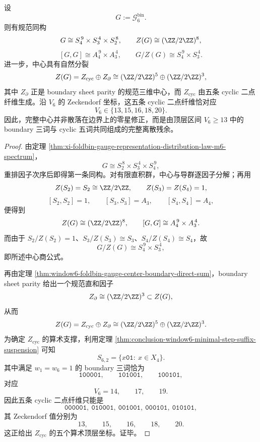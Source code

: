 \begin{theorem}\label{thm:conclusion-window6-full-center-derived-central-quotient}
设
\[
G:=\mathcal G_6^{\mathrm{bin}}.
\]
则有规范同构
\[
G\cong S_4^{\,9}\times S_3^{\,4}\times S_2^{\,8},
\qquad
Z(G)\cong (\ZZ/2\ZZ)^8,
\]
\[
[G,G]\cong A_4^{\,9}\times A_3^{\,4},
\qquad
G/Z(G)\cong S_4^{\,9}\times S_3^{\,4}.
\]
进一步，中心具有自然分裂
\[
Z(G)=Z_{\mathrm{cyc}}\oplus Z_{\partial}
\cong
(\ZZ/2\ZZ)^5\oplus (\ZZ/2\ZZ)^3,
\]
其中 \(Z_{\partial}\) 正是 boundary sheet parity 的规范三维中心，而 \(Z_{\mathrm{cyc}}\) 由五条 cyclic 二点纤维生成。沿 \(V_6\) 的 Zeckendorf 坐标，这五条 cyclic 二点纤维恰对应
\[
V_6\in\{13,15,16,18,20\}.
\]
因此，完整中心并非散落在边界上的零星修正，而是由顶层区间 \(V_6\ge 13\) 中的 boundary 三词与 cyclic 五词共同组成的完整离散残余。
\end{theorem}
\begin{proof}
由定理 \ref{thm:xi-foldbin-gauge-representation-distribution-law-m6-spectrum}，
\[
G\cong S_2^{\,8}\times S_3^{\,4}\times S_4^{\,9},
\]
重排因子次序后即得第一条同构。对有限直积群，中心与导群逐因子分解；再用
\[
Z(S_2)=S_2\cong \ZZ/2\ZZ,\qquad
Z(S_3)=Z(S_4)=1,
\]
\[
[S_2,S_2]=1,\qquad
[S_3,S_3]=A_3,\qquad
[S_4,S_4]=A_4,
\]
便得到
\[
Z(G)\cong (\ZZ/2\ZZ)^8,
\qquad
[G,G]\cong A_4^{\,9}\times A_3^{\,4}.
\]
而由于 \(S_2/Z(S_2)=1\)、\(S_3/Z(S_3)\cong S_3\)、\(S_4/Z(S_4)\cong S_4\)，故
\[
G/Z(G)\cong S_4^{\,9}\times S_3^{\,4},
\]
即所述中心商公式。

再由定理 \ref{thm:window6-foldbin-gauge-center-boundary-direct-sum}，boundary sheet parity 给出一个规范直和因子
\[
Z_{\partial}\cong (\ZZ/2\ZZ)^3\subset Z(G),
\]
从而
\[
Z(G)=Z_{\mathrm{cyc}}\oplus Z_{\partial}
\cong
(\ZZ/2\ZZ)^5\oplus (\ZZ/2\ZZ)^3.
\]
为确定 \(Z_{\mathrm{cyc}}\) 的算术支撑，利用定理 \ref{thm:conclusion-window6-minimal-step-suffix-suspension} 可知
\[
S_{6,2}=\{x\mathtt{01}:\ x\in X_4\}.
\]
其中满足 \(w_1=w_6=1\) 的 boundary 三词恰为
\[
\mathtt{100001},\qquad \mathtt{101001},\qquad \mathtt{100101},
\]
对应
\[
V_6=14,\qquad 17,\qquad 19.
\]
因此五条 cyclic 二点纤维只能是
\[
\mathtt{000001},\ \mathtt{010001},\ \mathtt{001001},\ \mathtt{000101},\ \mathtt{010101},
\]
其 Zeckendorf 值分别为
\[
13,\qquad 15,\qquad 16,\qquad 18,\qquad 20.
\]
这正给出 \(Z_{\mathrm{cyc}}\) 的五个算术顶层坐标。证毕。
\end{proof}

